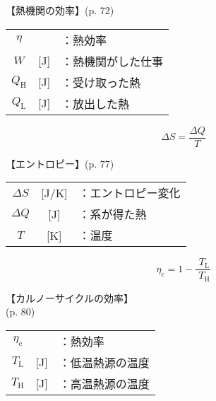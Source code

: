 \documentclass[10pt]{jarticle}
\begin{document}
\vskip3mm
【熱機関の効率】{\footnotesize (p. 72)}

\begin{tabular}{ccl}
$\eta$	&	&：熱効率\\
$W$	&[J]	&：熱機関がした仕事\\
$Q_\mathrm{H}$	&[J]	&：受け取った熱\\
$Q_\mathrm{L}$	&[J]	&：放出した熱
\end{tabular}



\newpage
\[
	\mathit{\Delta} S = \frac{\mathit{\Delta} Q}{T}
\]


\vskip3mm
【エントロピー】{\footnotesize (p. 77)}

\begin{tabular}{ccl}
$\mathit{\Delta} S$	&[J/K]	&：エントロピー変化\\
$\mathit{\Delta} Q$	&[J]	&：系が得た熱\\
$T$	&[K]	&：温度
\end{tabular}




\newpage
\[
	\eta_\mathrm{c} =  1- \frac{\; T_\mathrm{L}}{\; T_\mathrm{H}}
\]


\vskip3mm
【カルノーサイクルの効率】\\
\hfill {\footnotesize (p. 80)}

\begin{tabular}{ccl}
$\eta_\mathrm{c}$	&	&：熱効率\\
$T_\mathrm{L}$	&[J]	&：低温熱源の温度\\
$T_\mathrm{H}$	&[J]	&：高温熱源の温度
\end{tabular}
\end{document}
